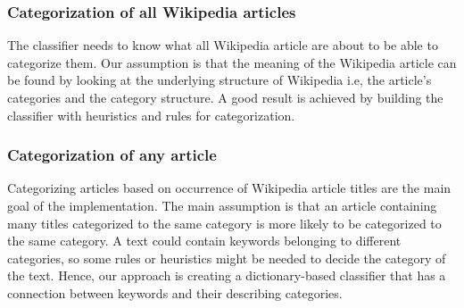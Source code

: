 \subsubsection{Categorization of all Wikipedia articles}
The classifier needs to know what all Wikipedia article are about to be able to categorize them. Our assumption is that the meaning of the Wikipedia article can be found by looking at the underlying structure of Wikipedia i.e, the article's categories and the category structure. A good result is achieved by building the classifier with heuristics and rules for categorization. 

\begin{comment}

Categorizing the articles can be done 

When the most describing categories of the article is found

Here the task is to create classifier that looks at the underlying structure of Wikipedia to describe the categories and then 

into their most describing categories. To be able to do this, it is essential to look at the underlying structure of Wikipedia to determine what the article is about. 

Since there are no training sets available, the categorization has to be unsupervised. Wikipedia still has an underlying structure which is useful for determining the most likely categories for all Wikipedia articles. This means that we can use this as heuristic for our categorization. 
\end{comment}


\subsubsection{Categorization of any article}
Categorizing articles based on occurrence of Wikipedia article titles are the main goal of the implementation. The main assumption is that an article containing many titles categorized to the same category is more likely to be categorized to the same category. A text could contain keywords belonging to different categories, so some rules or heuristics might be needed to decide the category of the text. Hence, our approach is creating a dictionary-based classifier that has a connection between keywords and their describing categories.

